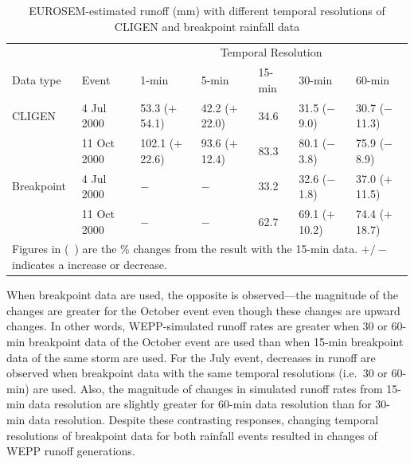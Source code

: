 \begin{table}[htbp]
  \centering
  \footnotesize
  \caption[EUROSEM-estimated runoff (mm) with different temporal resolutions of
CLIGEN and breakpoint rainfall data]{EUROSEM-estimated runoff (mm) with
different temporal resolutions of CLIGEN and breakpoint rainfall data}
\label{tab:DifferentTemporalScalesOfRainfallDataOnEUROSEMRunoffEstimation}
    \begin{tabular}{lllllll}
      \toprule
      & & \multicolumn{5}{c}{Temporal Resolution}\\
      \cmidrule{3-7}
      Data type & Event & 1-min & 5-min & 15-min & 30-min & 60-min \\
      \midrule
      CLIGEN & 4 Jul 2000 & 53.3 ($+$54.1) & 42.2 ($+$22.0) & 34.6 & 31.5
($-$9.0) & 30.7 ($-$11.3) \\
       & 11 Oct 2000 & 102.1 ($+$22.6) & 93.6 ($+$12.4) & 83.3 & 80.1 ($-$3.8) &
75.9 ($-$8.9) \\
       \midrule
      Breakpoint & 4 Jul 2000 & $-$ & $-$ & 33.2 & 32.6 ($-$1.8) & 37.0
($+$11.5) \\
       & 11 Oct 2000 & $-$ & $-$ & 62.7 & 69.1 ($+$10.2) & 74.4 ($+$18.7)\\
      \bottomrule
      \multicolumn{7}{p{12cm}}{\footnotesize Figures in (\ ) are the \% changes
from the result with the 15-min data. $+/-$ indicates a increase or decrease.}\\
    \end{tabular}
\end{table}

When breakpoint data are used, the opposite is observed---the magnitude of the
changes are greater for the October event even though these changes are upward
changes. In other words, WEPP-simulated runoff rates are greater when 30 or
60-min breakpoint data of the October event are used than when 15-min
breakpoint data of the same storm are used. For the July event, decreases in
runoff are observed when breakpoint data with the same temporal resolutions
(i.e.\
30 or 60-min) are used. Also, the magnitude of changes in simulated runoff
rates from 15-min data resolution are slightly greater for 60-min data
resolution than for
30-min data resolution. Despite these contrasting responses, changing temporal
resolutions
of breakpoint data for both rainfall events resulted in changes of WEPP runoff
generations.

